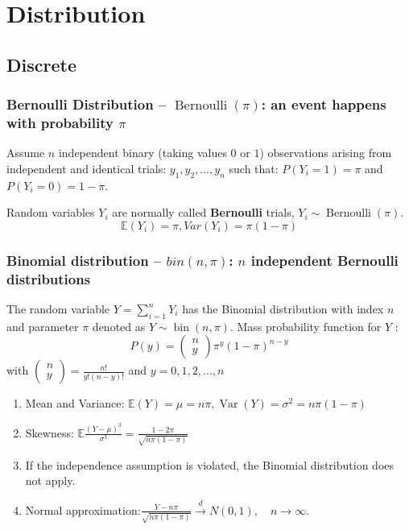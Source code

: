 \documentclass[11pt]{elegantbook}
\begin{document}
\chapter{Distribution}

\section{Discrete}
\subsection{Bernoulli Distribution -- $\operatorname{Bernoulli}(\pi)$: an event happens with probability $\pi$}
Assume $n$ independent binary (taking values $0$ or $1$) observations arising from independent and identical trials: $y_{1}, y_{2}, \ldots, y_{n}$ such that: $P\left(Y_{i}=1\right)=\pi$ and $P\left(Y_{i}=0\right)=1-\pi$.

Random variables $Y_{i}$ are normally called \textbf{Bernoulli} trials, $Y_{i} \sim \operatorname{Bernoulli}(\pi)$. $$\mathbb{E}(Y_i)=\pi,Var(Y_i)=\pi(1-\pi)$$

\subsection{Binomial distribution -- $bin(n,\pi)$: $n$ independent Bernoulli distributions}
The random variable $Y=\sum_{i=1}^{n} Y_{i}$ has the Binomial distribution with index $n$ and parameter $\pi$ denoted as $Y \sim \operatorname{bin}(n, \pi)$.
Mass probability function for $Y$ :
$$
P(y)=\left(\begin{array}{l}
n \\
y
\end{array}\right) \pi^{y}(1-\pi)^{n-y}
$$
with $\left(\begin{array}{l}n \\ y\end{array}\right)=\frac{n !}{y !(n-y) !}$ and $y=0,1,2, \ldots, n$
\begin{enumerate}[(1)]
    \item Mean and Variance:
    $\mathbb{E}(Y)=\mu=n \pi,\operatorname{Var}(Y)=\sigma^{2}=n \pi(1-\pi)$
    \item Skewness: $\mathbb{E}\frac{(Y-\mu)^{3}}{\sigma^{3}}=\frac{1-2 \pi}{\sqrt{n \pi(1-\pi)}}$
    \item If the independence assumption is violated, the Binomial distribution does not apply.
    \item Normal approximation:$\frac{Y-n \pi}{\sqrt{n \pi(1-\pi)}} \stackrel{d}{\longrightarrow} N(0,1),\quad {n \rightarrow \infty}$.
\end{enumerate}
\end{document}
